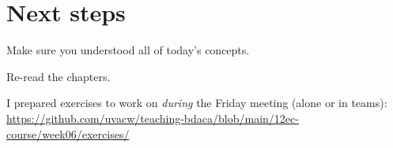 












\section{Next steps}

\begin{frame}[standout]
Make sure you understood all of today's concepts.

Re-read the chapters.

I prepared exercises to work on \emph{during} the Friday meeting (alone or in teams):
\large{\url{https://github.com/uvacw/teaching-bdaca/blob/main/12ec-course/week06/exercises/}}
\end{frame}





\begin{frame}
	\printbibliography
\end{frame}




